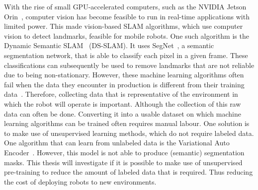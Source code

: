 With the rise of small GPU-accelerated computers, such as the NVIDIA Jetson Orin~\cite{NVIDIA_Karumbunathan_2022}, computer vision has become feasible to run in real-time applications with limited power. This made vision-based SLAM algorithms, which use computer vision to detect landmarks, feasible for mobile robots. One such algorithm is the Dynamic Semantic SLAM~\cite{yu2018ds} (DS-SLAM). It uses SegNet~\cite{badri2017segnet}, a semantic segmentation network, that is able to classify each pixel in a given frame. These classifications can subsequently be used to remove landmarks that are not reliable due to being non-stationary. However, these machine learning algorithms often fail when the data they encounter in production is different from their training data~\cite{Goodfellow-et-al-2016,ozdag2018adversarial,warde201611,10.14778/3632093.3632098,DBLP:journals/corr/KurakinGB16a,10.1145/3422622}. Therefore, collecting data that is representative of the environment in which the robot will operate is important. Although the collection of this raw data can often be done. Converting it into a usable dataset on which machine learning algorithms can be trained often requires manual labour. One solution is to make use of unsupervised learning methods, which do not require labeled data. One algorithm that can learn from unlabeled data is the Variational Auto Encoder~\cite{kingma2014autoencodingvariationalbayes}. However, this model is not able to produce (semantic) segmentation masks. This thesis will investigate if it is possible to make use of unsupervised pre-training to reduce the amount of labeled data that is required. Thus reducing the cost of deploying robots to new environments.

